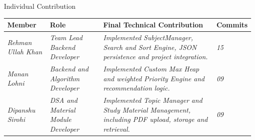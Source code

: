 \documentclass[aspectratio=169,11pt]{beamer}
\newcommand{\placeholder}[1]{%
\textit{\color{GEUGrey}#1}
}
\begin{document}
\begin{frame}{Individual Contribution}

\scriptsize

\begin{center}

\renewcommand{\arraystretch}{1.35}

\begin{tabularx}{.96\textwidth}
{@{}p{1.8cm}p{1.8cm}X p{1.5cm}@{}}

\toprule
Member &
Role &
Final Technical Contribution &
Commits\\
\midrule

\placeholder{Rehman Ullah Khan} &
\placeholder{Team Lead Backend Developer } &
\placeholder{Implemented SubjectManager, Search and Sort Engine, JSON persistence and project integration.} &
\placeholder{15}\\

\placeholder{Manan Lohni} &
\placeholder{Backend and Algorithm Developer} &
\placeholder{Implemented Custom Max Heap and weighted Priority Engine and recommendation logic. } &
\placeholder{09}\\

\placeholder{Dipanshu Sirohi} &
\placeholder{DSA and Material Module Developer} &
\placeholder{Implemented Topic Manager and Study Material Management, including PDF upload, storage and retrieval. } &
\placeholder{09}\\


\bottomrule

\end{tabularx}

\end{center}

\vspace{3mm}


\end{frame}
\end{document}
